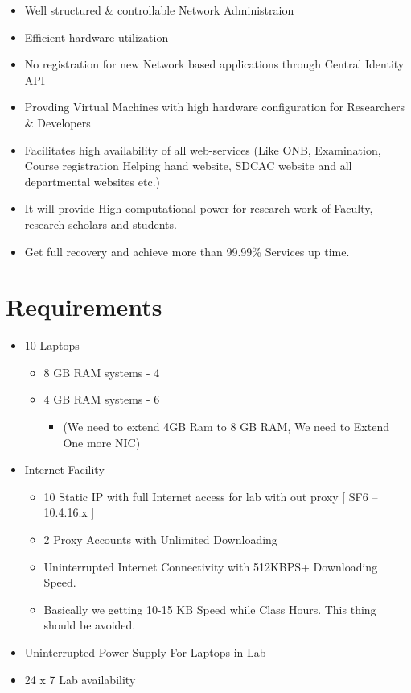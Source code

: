 \documentclass[]{article}
\begin{document}
\begin{itemize}
	\item Well structured \& controllable Network Administraion
	\item Efficient hardware utilization
	\item No registration for new Network based applications through Central Identity API
	\item Provding Virtual Machines with high hardware configuration for Researchers \& Developers
	\item Facilitates high availability of all web-services (Like ONB, Examination, Course registration Helping hand website, SDCAC website and all departmental websites etc.)
	\item It will provide High computational power for research work of Faculty, research scholars and students.
	\item Get full recovery and  achieve more than 99.99\% Services up time.
\end{itemize}


\section*{Requirements}
\begin{center}
\begin{itemize}
\item  10 Laptops %
\begin{itemize}
	\item  8 GB RAM systems - 4 
	\item  4 GB RAM systems - 6 
	\begin{itemize}
		\item (We need to extend 4GB Ram to 8 GB RAM, We need to Extend One more NIC)
	\end{itemize}
	
\end{itemize}
 
\item Internet Facility 
\begin{itemize}
	\item 10 Static IP with full Internet access for lab with out proxy [ SF6 – 10.4.16.x ]
	\item 2 Proxy Accounts with Unlimited Downloading 
	\item Uninterrupted Internet Connectivity with 512KBPS+ Downloading Speed.
	\item Basically we getting 10-15 KB Speed while Class Hours. This thing should be avoided.
\end{itemize}

\item Uninterrupted Power Supply For Laptops in Lab
\item 24 x 7 Lab availability
\end{itemize}
\end{center}
\end{document}
